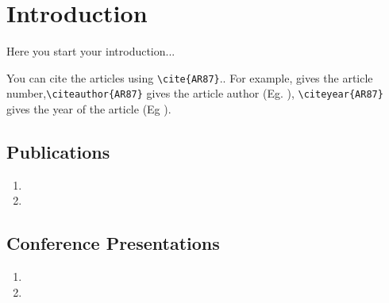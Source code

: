\chapter{Introduction}

 
Here you start your introduction...


You can cite the articles using \verb|\cite{AR87}|.. For example, \cite{AR87} gives the article number,\verb|\citeauthor{AR87}|  gives the article author (Eg.  \citeauthor{AR87}), \verb|\citeyear{AR87}| gives the year of the article (Eg \citeyear{AR87}).


\blindtext




\section{Publications}
\begin{enumerate}
\item {}
\item {}
\end{enumerate}

\section{Conference Presentations}

\begin{enumerate}
	\item {}
	\item {}
\end{enumerate}
